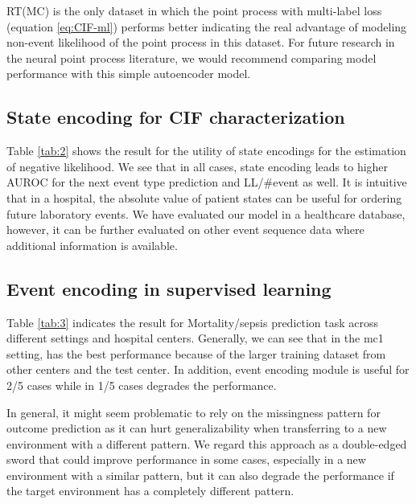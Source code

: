 \documentclass[journal,twoside,web]{ieeecolor}
\begin{document}
RT(MC) is the only dataset in which the point process with multi-label loss (equation \ref*{eq:CIF-ml}) performs better indicating the real advantage of modeling non-event likelihood of the point process in this dataset. For future research in the neural point process literature, we would recommend comparing model performance with this simple autoencoder model.


\subsection{State encoding for CIF characterization}


  
  


Table \ref*{tab:2} shows the result for the utility of state encodings for the estimation of negative likelihood. We see that in all cases, state encoding leads to higher AUROC for the next event type prediction and LL/\#event as well. It is intuitive that in a hospital, the absolute value of patient states can be useful for ordering future laboratory events. We have evaluated our model in a healthcare database, however, it can be further evaluated on other event sequence data where additional information is available.



\subsection{Event encoding in supervised learning}

Table \ref*{tab:3} indicates the result for Mortality/sepsis prediction task across different settings and hospital centers. Generally, we can see that in the mc1 setting, has the best performance because of the larger training dataset from other centers and the test center. In addition, event encoding module is useful for 2/5 cases while in 1/5 cases degrades the performance.

In general, it might seem problematic to rely on the missingness pattern for outcome prediction as it can hurt generalizability when transferring to a new environment with a different pattern. We regard this approach as a double-edged sword that could improve performance in some cases, especially in a new environment with a similar pattern, but it can also degrade the performance if the target environment has a completely different pattern.
\end{document}
